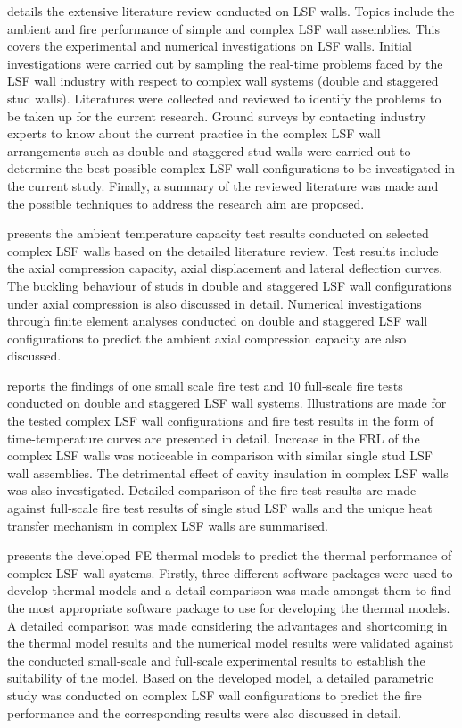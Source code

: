 \textbf{} details the extensive literature review conducted on LSF walls. Topics include the ambient and fire performance of simple and complex LSF wall assemblies. This covers the experimental and numerical investigations on LSF walls. Initial investigations were carried out by sampling the real-time problems faced by the LSF wall industry with respect to complex wall systems (double and staggered stud walls). Literatures were collected and reviewed to identify the problems to be taken up for the current research. Ground surveys by contacting industry experts to know about the current practice in the complex LSF wall arrangements such as double and staggered stud walls were carried out to determine the best possible complex LSF wall configurations to be investigated in the current study. Finally, a summary of the reviewed literature was made and the possible techniques to address the research aim are proposed.

\textbf{} presents the ambient temperature capacity test results conducted on selected complex LSF walls based on the detailed literature review. Test results include the axial compression capacity, axial displacement and lateral deflection curves. The buckling behaviour of studs in double and staggered LSF wall configurations under axial compression is also discussed in detail. Numerical investigations through finite element analyses conducted on double and staggered LSF wall configurations to predict the ambient axial compression capacity are also discussed. 

\textbf{} reports the findings of one small scale fire test and 10 full-scale fire tests conducted on double and staggered LSF wall systems. Illustrations are made for the tested complex LSF wall configurations and fire test results in the form of time-temperature curves are presented in detail. Increase in the FRL of the complex LSF walls was noticeable in comparison with similar single stud LSF wall assemblies. The detrimental effect of cavity insulation in complex LSF walls was also investigated. Detailed comparison of the fire test results are made against full-scale fire test results of single stud LSF walls and the unique heat transfer mechanism in complex LSF walls are summarised. 

\textbf{} presents the developed FE thermal models to predict the thermal performance of complex LSF wall systems. Firstly, three different software packages were used to develop thermal models and a detail comparison was made amongst them to find the most appropriate software package to use for developing the thermal models. A detailed comparison was made considering the advantages and shortcoming in the thermal model results and the numerical model results were validated against the conducted small-scale and full-scale experimental results to establish the suitability of the model. Based on the developed model, a detailed parametric study was conducted on complex LSF wall configurations to predict the fire performance and the corresponding results were also discussed in detail.

